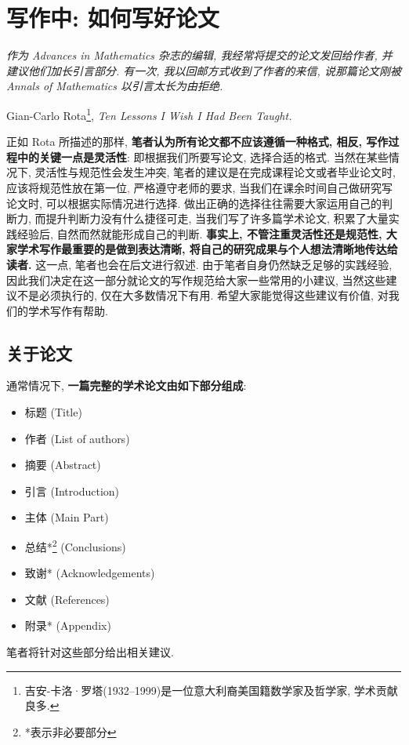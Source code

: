 \documentclass{formatBook}
\newcommand{\XG}[1]{\textcolor{red}{#1}}
\begin{document}
\section{写作中: 如何写好论文}
\noindent \textit{作为 Advances in Mathematics 杂志的编辑, 我经常将提交的论文发回给作者, 并建议他们加长引言部分. 有一次, 我以回邮方式收到了作者的来信, 说那篇论文刚被 Annals of Mathematics 以引言太长为由拒绝. }
\begin{flushright}
    \cndash Gian-Carlo Rota\footnote{吉安-卡洛·罗塔(1932–1999)是一位意大利裔美国籍数学家及哲学家, 学术贡献良多.}, \textit{Ten Lessons I Wish I Had Been Taught\cite{RotaTen1997}.}
\end{flushright}

正如 Rota 所描述的那样, \textbf{笔者认为所有论文都不应该遵循一种格式, 相反, 写作过程中的关键一点是灵活性}: 即根据我们所要写论文, 选择合适的格式.
当然在某些情况下, 灵活性与规范性会发生冲突, 笔者的建议是在完成课程论文或者毕业论文时, 应该将规范性放在第一位\XG{,} 严格遵守老师的要求, 当我们在课余时间自己做研究写论文时, 可以根据实际情况进行选择.
做出正确的选择往往需要大家运用自己的判断力, 而提升判断力没有什么捷径可走, 当我们写了许多篇学术论文, 积累了大量实践经验后, 自然而然就能形成自己的判断.
\textbf{事实上, 不管注重灵活性还是规范性, 大家学术写作最重要的是做到表达清晰, 将自己的研究成果与个人想法清晰地传达给读者.} 这一点, 笔者也会在后文进行叙述.
由于笔者自身仍然缺乏足够的实践经验, 因此我们决定在这一部分就论文的写作规范给大家一些常用的小建议, 当然这些建议不是必须执行的, 仅在大多数情况下有用. 希望大家能觉得这些建议有价值, 对我们的学术写作有帮助.
\subsection{关于论文}
通常情况下, \textbf{一篇完整的学术论文由如下部分组成}:
\begin{itemize}
    \item 标题 (Title)
    \item 作者 (List of authors)
    \item 摘要 (Abstract)
    \item 引言 (Introduction)
    \item 主体 (Main Part)
    \item 总结*\footnote{*表示非必要部分} (Conclusions)
    \item 致谢* (Acknowledgements)
    \item 文献 (References)
    \item 附录* (Appendix)
\end{itemize}
\par
笔者将针对这些部分给出相关建议.
\end{document}
